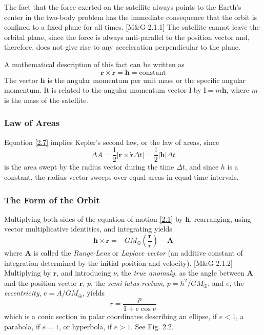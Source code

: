 \documentclass[11pt]{article}
\begin{document}
The fact that the force exerted on the satellite always
points to the Earth's center in the two-body problem has the immediate
consequence that the orbit is confined to a fixed plane for all
times. [M\&G-2.1.1] The satellite cannot leave the orbital plane, since the force
is always anti-parallel to the position vector and, therefore, does
not give rise to any acceleration perpendicular to the plane.

A mathematical description of this fact can be written as
\begin{equation}
  \boldsymbol{r}\times\dot{\boldsymbol{r}} = \boldsymbol{h}
                                           = \text{constant} \label{2.7}\tag{2.7}
\end{equation}
The vector $\boldsymbol{h}$ is the angular momentum per unit mass or
the specific angular momentum. It is related to the angular momentum
vector $\boldsymbol{l}$ by $\boldsymbol{l}=m\boldsymbol{h}$, where $m$
is the mass of the satellite.

\subsubsection{Law of Areas}

Equation \eqref{2.7} implies Kepler's second law, or the law of areas,
since
\begin{equation}
  \Delta A = \frac{1}{2}|\boldsymbol{r}\times\dot{\boldsymbol{r}}\Delta t| 
           = \frac{1}{2}|\boldsymbol{h}|\Delta t \label{2.8}\tag{2.8}
\end{equation}
is the area swept by the radius vector during the time $\Delta t$, and
since $h$ is a constant, the radius vector sweeps over equal areas in
equal time intervals.

\subsubsection{The Form of the Orbit}

Multiplying both sides of the equation of motion
\eqref{2.1} by $\boldsymbol{h}$, rearranging, using vector
multiplicative identities, and integrating yields
\begin{equation}
  \boldsymbol{h}\times\dot{\boldsymbol{r}}
  = -GM_{\oplus}\left(\frac{\boldsymbol{r}}{r}\right) - \boldsymbol{A} \label{2.12}\tag{2.12}
\end{equation}
where $\boldsymbol{A}$ is called the {\em Runge-Lenz} or {\em Laplace
  vector} (an additive constant of integration determined by the
initial position and velocity). [M\&G-2.1.2] Multiplying by $\boldsymbol{r}$, and
introducing $\nu$, the {\em true anomaly}, as the angle between
$\boldsymbol{A}$ and the position vector $\boldsymbol{r}$, $p$, the
{\em semi-latus rectum}, $p = h^2 / GM_{\oplus}$, and $e$, the {\em
  eccentricity}, $e = A / GM_{\oplus}$, yields
\begin{equation}
  r = \frac{p}{1 + e\cos\nu} \label{2.17}\tag{2.17}
\end{equation}
which is a conic section in polar coordinates describing an ellipse,
if $e < 1$, a parabola, if $e = 1$, or hyperbola, if $e > 1$. See
Fig. 2.2.
\end{document}
